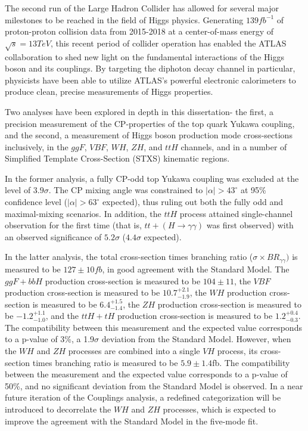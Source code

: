 The second run of the Large Hadron Collider has allowed for several major milestones to be reached in the field of Higgs physics. Generating $139 fb^{-1}$ of proton-proton collision data from 2015-2018 at a center-of-mass energy of $\sqrt{s} = 13 TeV$, this recent period of collider operation has enabled the ATLAS collaboration to shed new light on the fundamental interactions of the Higgs boson and its couplings. By targeting the diphoton decay channel in particular, physicists have been able to utilize ATLAS's powerful electronic calorimeters to produce clean, precise measurements of Higgs properties.

Two analyses have been explored in depth in this dissertation- the first, a precision measurement of the CP-properties of the top quark Yukawa coupling, and the second, a measurement of Higgs boson production mode cross-sections inclusively, in the $ggF$, $VBF$, $WH$, $ZH$, and $ttH$ channels, and in a number of Simplified Template Cross-Section (STXS) kinematic regions.

In the former analysis, a fully CP-odd top Yukawa coupling was excluded at the level of $3.9 \sigma$. The CP mixing angle was constrained to $|\alpha| > 43^{\circ}$ at 95\% confidence level ($|\alpha| > 63^{\circ}$ expected), thus ruling out both the fully odd and maximal-mixing scenarios. In addition, the $ttH$ process attained single-channel observation for the first time (that is, $tt+(H \rightarrow \gamma \gamma)$ was first observed) with an observed significance of $5.2 \sigma$ ($4.4 \sigma$ expected). 

In the latter analysis, the total cross-section times branching ratio ($\sigma \times BR_{\gamma \gamma})$ is measured to be $127\pm 10 fb$, in good agreement with the Standard Model. The $ggF+bbH$ production cross-section is measured to be $104 \pm 11$, the $VBF$ production cross-section is measured to be $10.7^{+2.1}_{-1.9}$, the $WH$ production cross-section is measured to be $6.4^{+1.5}_{-1.4}$, the $ZH$ production cross-section is measured to be $-1.2^{+1.1}_{-1.0}$, and the $ttH+tH$ production cross-section is measured to be $1.2^{+0.4}_{-0.3}$. The compatibility between this measurement and the expected value corresponds to a p-value of 3\%, a 1.9$\sigma$ deviation from the Standard Model. However, when the $WH$ and $ZH$ processes are combined into a single $VH$ process, its cross-section times branching ratio is measured to be $5.9 \pm 1.4$fb. The compatibility between the measurement and the expected value corresponds to a p-value of 50\%, and no significant deviation from the Standard Model is observed. In a near future iteration of the Couplings analysis, a redefined categorization will be introduced to decorrelate the $WH$ and $ZH$ processes, which is expected to improve the agreement with the Standard Model in the five-mode fit.

